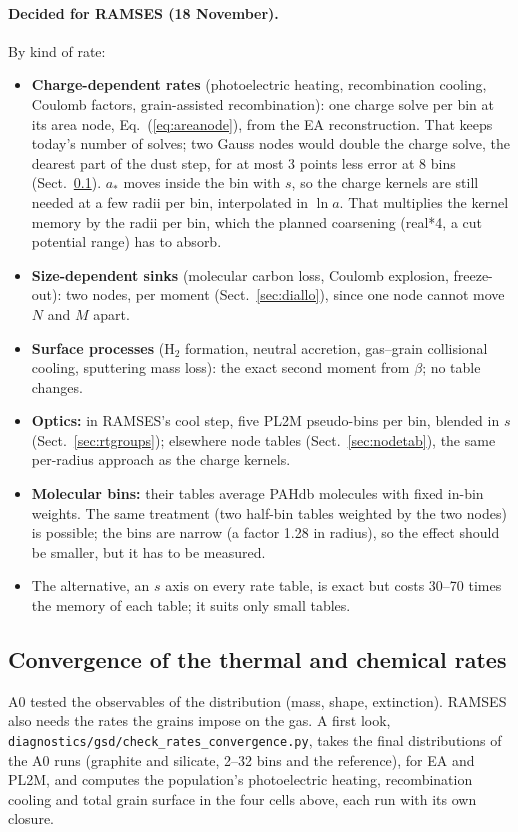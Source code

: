 \documentclass[11pt,a4paper]{article}
\begin{document}
\paragraph{Decided for RAMSES (18 November).} By kind of rate:
\begin{itemize}
\item \textbf{Charge-dependent rates} (photoelectric heating, recombination cooling, Coulomb factors, grain-assisted
  recombination): one charge solve per bin at its area node, Eq.~(\ref{eq:areanode}), from the EA reconstruction. That
  keeps today's number of solves; two Gauss nodes would double the charge solve, the dearest part of the dust step,
  for at most 3 points less error at 8 bins (Sect.~\ref{sec:rateconv}). $a_*$ moves inside the bin with $s$, so the
  charge kernels are still needed at a few radii per bin, interpolated in $\ln a$. That multiplies the kernel memory
  by the radii per bin, which the planned coarsening (real*4, a cut potential range) has to absorb.
\item \textbf{Size-dependent sinks} (molecular carbon loss, Coulomb explosion, freeze-out): two nodes, per moment
  (Sect.~\ref{sec:diallo}), since one node cannot move $N$ and $M$ apart.
\item \textbf{Surface processes} (H$_2$ formation, neutral accretion, gas--grain collisional cooling, sputtering mass
  loss): the exact second moment from $\beta$; no table changes.
\item \textbf{Optics:} in RAMSES's cool step, five PL2M pseudo-bins per bin, blended in $s$
  (Sect.~\ref{sec:rtgroups}); elsewhere node tables (Sect.~\ref{sec:nodetab}), the same per-radius approach as the
  charge kernels.
\item \textbf{Molecular bins:} their tables average PAHdb molecules with fixed in-bin weights. The same treatment
  (two half-bin tables weighted by the two nodes) is possible; the bins are narrow (a factor 1.28 in radius), so the
  effect should be smaller, but it has to be measured.
\item The alternative, an $s$ axis on every rate table, is exact but costs 30--70 times the memory of each table; it
  suits only small tables.
\end{itemize}

\subsection{Convergence of the thermal and chemical rates}\label{sec:rateconv}
A0 tested the observables of the distribution (mass, shape, extinction). RAMSES also needs the rates the grains impose
on the gas. A first look, \texttt{diagnostics/gsd/check\_rates\_convergence.py}, takes the final distributions of the
A0 runs (graphite and silicate, 2--32 bins and the reference), for EA and PL2M, and computes the population's
photoelectric heating, recombination cooling and total grain surface in the four cells above, each run with its own
closure.
\end{document}
